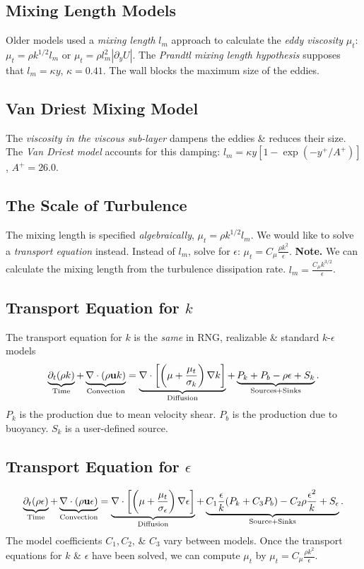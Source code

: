 \documentclass[oneside]{book}
\numberwithin{equation}{section}
\begin{document}
\subsection{Mixing Length Models}
Older models used a \textit{mixing length} $l_m$ approach to calculate the \textit{eddy viscosity} $\mu_t$: $\mu_t = \rho k^{1/2}l_m$  or $\mu_t = \rho l_m^2|\partial_yU|$. The \textit{Prandtl mixing length hypothesis} supposes that $l_m = \kappa y$, $\kappa = 0.41$. The wall blocks the maximum size of the eddies.

\subsection{Van Driest Mixing Model}
The \textit{viscosity in the viscous sub-layer} dampens the eddies \& reduces their size. The \textit{Van Driest model} accounts for this damping: $l_m = \kappa y\left[1 - \exp(-y^+/A^+)\right]$, $A^+ = 26.0$.

\subsection{The Scale of Turbulence}
The mixing length is specified \textit{algebraically}, $\mu_t = \rho k^{1/2}l_m$. We would like to solve a \textit{transport equation} instead. Instead of $l_m$, solve for $\epsilon$: $\mu_t = C_\mu\frac{\rho k^2}{\epsilon}$. \textbf{Note.} We can calculate the mixing length from the turbulence dissipation rate. $l_m = \frac{C_\mu k^{3/2}}{\epsilon}$.

\subsection{Transport Equation for $k$}
The transport equation for $k$ is the \textit{same} in RNG, realizable \& standard $k$-$\epsilon$ models
\begin{align*}
	\underbrace{\partial_t(\rho k)}_{\rm Time} + \underbrace{\nabla\cdot(\rho{\bf u}k)}_{\rm Convection} = \underbrace{\nabla\cdot\left[\left(\mu + \frac{\mu_t}{\sigma_k}\right)\nabla k\right]}_{\rm Diffusion} + \underbrace{P_k + P_b - \rho\epsilon + S_k}_{\rm Sources + Sinks}.
\end{align*}
$P_k$ is the production due to mean velocity shear. $P_b$ is the production due to buoyancy. $S_k$ is a user-defined source.

\subsection{Transport Equation for $\epsilon$}
\begin{align*}
	\underbrace{\partial_t(\rho\epsilon)}_{\rm Time} + \underbrace{\nabla\cdot(\rho{\bf u}\epsilon)}_{\rm Convection} = \underbrace{\nabla\cdot\left[\left(\mu + \frac{\mu_t}{\sigma_\epsilon}\right)\nabla\epsilon\right]}_{\rm Diffusion} + \underbrace{C_1\frac{\epsilon}{k}(P_k + C_3P_b) - C_2\rho\frac{\epsilon^2}{k} + S_\epsilon}_{\rm Source + Sinks}.
\end{align*}
The model coefficients $C_1,C_2$, \& $C_3$ vary between models. Once the transport equations for $k$ \& $\epsilon$ have been solved, we can compute $\mu_t$ by $\mu_t = C_\mu\frac{\rho k^2}{\epsilon}$.
\end{document}
